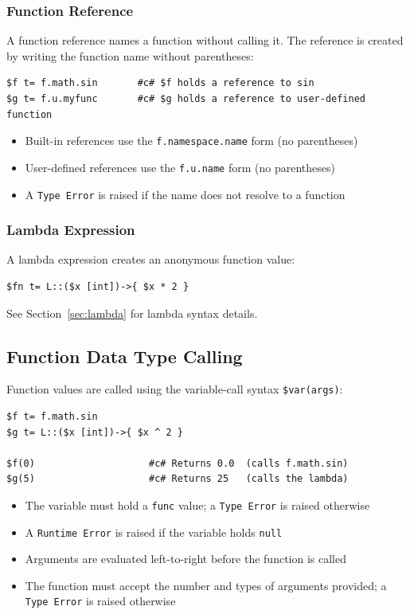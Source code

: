\subsubsection{Function Reference}
A function reference names a function without calling it. The reference is created by writing the function name without parentheses:
\begin{verbatim}
$f t= f.math.sin       #c# $f holds a reference to sin
$g t= f.u.myfunc       #c# $g holds a reference to user-defined function
\end{verbatim}
\begin{itemize}
\item Built-in references use the \texttt{f.namespace.name} form (no parentheses)
\item User-defined references use the \texttt{f.u.name} form (no parentheses)
\item A \texttt{Type Error} is raised if the name does not resolve to a function
\end{itemize}

\subsubsection{Lambda Expression}
A lambda expression creates an anonymous function value:
\begin{verbatim}
$fn t= L::($x [int])->{ $x * 2 }
\end{verbatim}
See Section~\ref{sec:lambda} for lambda syntax details.

\subsection{Function Data Type Calling}
Function values are called using the variable-call syntax \texttt{\$var(args)}:
\begin{verbatim}
$f t= f.math.sin
$g t= L::($x [int])->{ $x ^ 2 }

$f(0)                    #c# Returns 0.0  (calls f.math.sin)
$g(5)                    #c# Returns 25   (calls the lambda)
\end{verbatim}
\begin{itemize}
\item The variable must hold a \texttt{func} value; a \texttt{Type Error} is raised otherwise
\item A \texttt{Runtime Error} is raised if the variable holds \texttt{null}
\item Arguments are evaluated left-to-right before the function is called
\item The function must accept the number and types of arguments provided; a \texttt{Type Error} is raised otherwise
\end{itemize}

